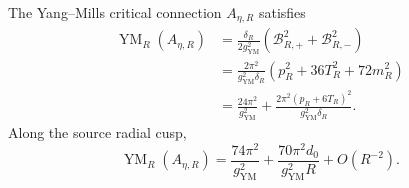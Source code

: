 \begin{theorem}
\label{thm:s6cusp-native-split-action}
The Yang--Mills critical connection \(A_{\eta,R}\) satisfies
\begin{align}
 \operatorname{YM}_R(A_{\eta,R})
 &=\frac{\delta_R}{2g_{\mathrm{YM}}^2}
   \left(\mathcal B_{R,+}^2+\mathcal B_{R,-}^2\right)
 \label{eq:s6cusp-native-action-frequencies}\\
 &=\frac{2\pi^2}{g_{\mathrm{YM}}^2\delta_R}
   \left(p_R^2+36T_R^2+72m_R^2\right)
 \label{eq:s6cusp-native-action-coordinates}\\
 &=\frac{24\pi^2}{g_{\mathrm{YM}}^2}
   +\frac{2\pi^2(p_R+6T_R)^2}
   {g_{\mathrm{YM}}^2\delta_R}.
 \label{eq:s6cusp-native-action-excess}
\end{align}
Along the source radial cusp,
\begin{equation}\label{eq:s6cusp-native-action-cusp}
 \operatorname{YM}_R(A_{\eta,R})
 =\frac{74\pi^2}{g_{\mathrm{YM}}^2}
  +\frac{70\pi^2d_0}{g_{\mathrm{YM}}^2R}
  +O(R^{-2}).
\end{equation}
\end{theorem}

